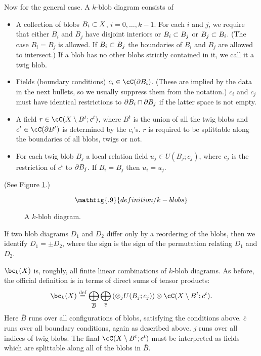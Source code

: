Now for the general case.
A $k$-blob diagram consists of
\begin{itemize}
\item A collection of blobs $B_i \subset X$, $i = 0, \ldots, k-1$.
For each $i$ and $j$, we require that either $B_i$ and $B_j$ have disjoint interiors or
$B_i \subset B_j$ or $B_j \subset B_i$.
(The case $B_i = B_j$ is allowed.
If $B_i \subset B_j$ the boundaries of $B_i$ and $B_j$ are allowed to intersect.)
If a blob has no other blobs strictly contained in it, we call it a twig blob.
\item Fields (boundary conditions) $c_i \in \cC(\bd B_i)$.
(These are implied by the data in the next bullets, so we usually
suppress them from the notation.)
$c_i$ and $c_j$ must have identical restrictions to $\partial B_i \cap \partial B_j$
if the latter space is not empty.
\item A field $r \in \cC(X \setmin B^t; c^t)$,
where $B^t$ is the union of all the twig blobs and $c^t \in \cC(\bd B^t)$
is determined by the $c_i$'s.
$r$ is required to be splittable along the boundaries of all blobs, twigs or not.
\item For each twig blob $B_j$ a local relation field $u_j \in U(B_j; c_j)$,
where $c_j$ is the restriction of $c^t$ to $\partial B_j$.
If $B_i = B_j$ then $u_i = u_j$.
\end{itemize}
(See Figure \ref{blobkdiagram}.)
\begin{figure}[t]\begin{equation*}
\mathfig{.9}{definition/k-blobs}
\end{equation*}\caption{A $k$-blob diagram.}\label{blobkdiagram}\end{figure}

If two blob diagrams $D_1$ and $D_2$ 
differ only by a reordering of the blobs, then we identify
$D_1 = \pm D_2$, where the sign is the sign of the permutation relating $D_1$ and $D_2$.

$\bc_k(X)$ is, roughly, all finite linear combinations of $k$-blob diagrams.
As before, the official definition is in terms of direct sums
of tensor products:
\[
	\bc_k(X) \deq \bigoplus_{\overline{B}} \bigoplus_{\overline{c}}
		\left( \otimes_j U(B_j; c_j)\right) \otimes \lf(X \setmin B^t; c^t) .
\]
Here $\overline{B}$ runs over all configurations of blobs, satisfying the conditions above.
$\overline{c}$ runs over all boundary conditions, again as described above.
$j$ runs over all indices of twig blobs. The final $\lf(X \setmin B^t; c^t)$ must be interpreted as fields which are splittable along all of the blobs in $\overline{B}$.

